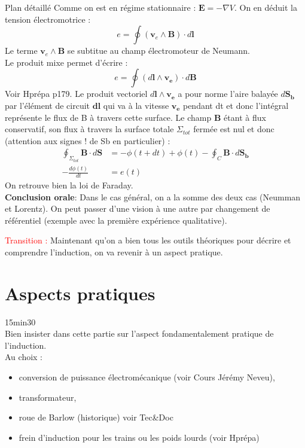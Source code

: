 \begin{reportBlock}{Plan détaillé}
 Comme on est en régime stationnaire :    $\mathbf E = - \nabla V$. On en déduit la tension électromotrice :
 \begin{equation}
     e = \oint (\mathbf v_e \land \mathbf B) \cdot d\mathbf{l}
 \end{equation}
 Le terme $\mathbf v_e \land \mathbf B$ se subtitue au champ électromoteur de Neumann.\\
 
 Le produit mixe permet d'écrire : 
 \begin{equation}
     e = \oint (d\mathbf {l} \land \mathbf{v_e}) \cdot d\mathbf{B} 
 \end{equation}
Voir Hprépa p179. Le produit vectoriel $d\mathbf {l} \land \mathbf{v_e}$ a pour norme l'aire balayée $d\mathbf{S_b}$ par l'élément de circuit $\mathbf{dl}$ qui va à la vitesse $\mathbf{v_e}$ pendant dt et donc l'intégral représente le flux de B à travers cette surface. Le champ $\mathbf{B}$ étant à flux conservatif, son flux à travers la surface totale $\Sigma_{tot}$ fermée est nul et donc (attention aux signes ! de Sb en particulier) :
\begin{align}
    \oint_{\Sigma_{tot}}\mathbf{B}\cdot d\mathbf{S} &= -\phi(t+dt) + \phi(t) - \oint_{C}\mathbf{B}\cdot d\mathbf{S_b} \\
    -\frac{d\phi(t)}{dt} &= e(t)
\end{align}
On retrouve bien la loi de Faraday.\\

\textbf{Conclusion orale}: Dans le cas général, on a la somme des deux cas (Neumman et Lorentz). On peut passer d'une vision à une autre par changement de référentiel (exemple avec la première expérience qualitative).

\textcolor{red}{Transition :} Maintenant qu'on a bien tous les outils théoriques pour décrire et comprendre l'induction, on va revenir à un aspect pratique.

\section{Aspects pratiques}
15min30\\
Bien insister dans cette partie sur l'aspect fondamentalement pratique de l'induction.\\
Au choix :
\begin{itemize}
    \item conversion de puissance électromécanique (voir Cours Jérémy Neveu),
    \item transformateur,
    \item roue de Barlow (historique) voir Tec\&Doc
    \item frein d'induction pour les trains ou les poids lourds (voir Hprépa)
\end{itemize}

\end{reportBlock}
